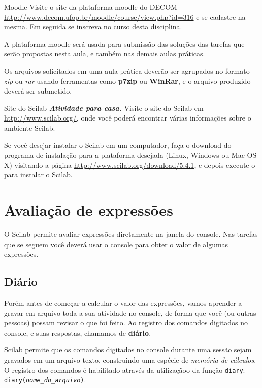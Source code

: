 \documentclass[11pt,fleqn]{practice}
\begin{document}
\begin{task}{Moodle}{}
  Visite o site da plataforma moodle do DECOM
  \url{http://www.decom.ufop.br/moodle/course/view.php?id=316} e se
  cadastre na mesma. Em seguida se inscreva no curso desta disciplina.

  A plataforma moodle será usada para submissão das soluções das tarefas
  que serão propostas nesta aula, e também nas demais aulas práticas.

  Os arquivos solicitados em uma aula prática deverão ser agrupados no
  formato \emph{zip} ou \emph{rar} usando ferramentas como
  \textbf{p7zip} ou \textbf{WinRar}, e o arquivo produzido deverá ser
  submetido.
\end{task}

\begin{task}{Site do Scilab}{}
  \textbf{\textit{Atividade para casa.}} Visite o site do Scilab em
  \url{http://www.scilab.org/}, onde você poderá encontrar várias
  informações sobre o ambiente Scilab.

  Se você desejar instalar o Scilab em um computador, faça o download do
  programa de instalação para a plataforma desejada (Linux, Windows ou
  Mac OS X) visitando a página
  \url{http://www.scilab.org/download/5.4.1}, e depois execute-o para
  instalar o Scilab.
\end{task}

\section{Avaliação de expressões}

O Scilab permite avaliar expressões diretamente na janela do
console. Nas tarefas que se seguem você deverá usar o console para obter
o valor de algumas expressões.

\subsection{Diário}

Porém antes de começar a calcular o valor das expressões, vamos aprender
a gravar em arquivo toda a sua atividade no console, de forma que você
(ou outras pessoas) possam revisar o que foi feito. Ao registro dos
comandos digitados no console, e suas respostas, chamamos de
\textbf{diário}.

Scilab permite que os comandos digitados no console durante uma sessão
sejam gravados em um arquivo texto, construindo uma espécie de
\emph{memória de cálculos}. O registro dos comandos é habilitado através
da utilizaçãoo da função \texttt{diary}:
\texttt{diary(\textsl{nome\_do\_arquivo})}.
\end{document}
